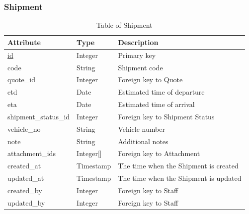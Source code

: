 \subsubsection{Shipment}
\begin{table}[H]
    \centering
    \begin{tabular}{|p{3.5cm}|p{2cm}|p{\dimexpr\textwidth-7.3cm}|} %
        \hline
        \rowcolor[HTML]{C0C0C0} 
        \textbf{Attribute} & \textbf{Type} & \textbf{Description} \\ \hline
        \underline{id} & Integer & Primary key \\ \hline
        code & String & Shipment code \\ \hline
        quote\_id & Integer & Foreign key to Quote \\ \hline
        etd & Date & Estimated time of departure \\ \hline
        eta & Date & Estimated time of arrival \\ \hline
        shipment\_status\_id & Integer & Foreign key to Shipment Status \\ \hline
        vehicle\_no & String & Vehicle number \\ \hline
        note & String & Additional notes \\ \hline
        attachment\_ids & Integer[] & Foreign key to Attachment \\ \hline
        created\_at & Timestamp & The time when the Shipment is created \\ \hline
        updated\_at & Timestamp & The time when the Shipment is updated \\ \hline
        created\_by & Integer & Foreign key to Staff \\ \hline
        updated\_by & Integer & Foreign key to Staff \\ \hline
    \end{tabular}
    \caption{Table of Shipment}
    \label{tab:shipment-table}
\end{table}

